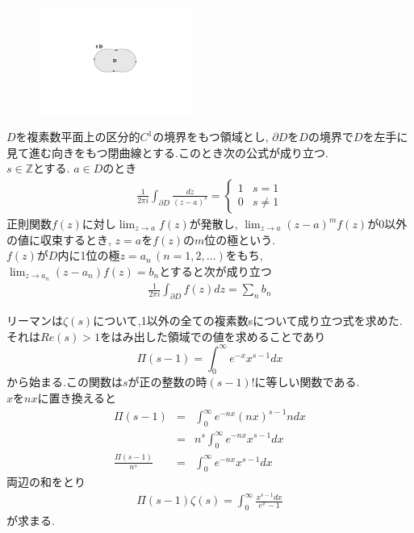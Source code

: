 \begin{figure}
\vspace{-2\baselineskip}
\begin{center}
\includegraphics[width=50mm]{zetamura1.pdf}
\end{center}
\end{figure}
$D$を複素数平面上の区分的$C^1$の境界をもつ領域とし, $\partial D$を$D$の境界で$D$を左手に見て進む向きをもつ閉曲線とする.このとき次の公式が成り立つ.\\
$s\in \mathbb{Z}$とする. $a\in D$のとき
\begin{eqnarray*}
\frac{1}{2\pi i}\int_{\partial D} \frac{dz}{(z-a)^s} = \begin{cases}
1 & s=1 \\ 
0 & s\neq1
\end{cases}
\end{eqnarray*}
正則関数$f(z)$に対し$\displaystyle{\lim_{z\to a}f(z)}$が発散し, $\displaystyle{\lim_{z\to a}(z-a)^m f(z)}$が0以外の値に収束するとき, $z=a$を$f(z)$の$m$位の極という.\\
$f(z)$が$D$内に1位の極$z=a_n\,(n=1,2,\ldots)$をもち, $\displaystyle{\lim_{z\to a_n}(z-a_n)f(z)}=b_n$とすると次が成り立つ
\begin{eqnarray*}
\frac{1}{2\pi i}\int_{\partial D} f(z)dz = \sum_n b_n
\end{eqnarray*}

リーマンは$\zeta(s)$について,1以外の全ての複素数sについて成り立つ式を求めた.\\
それは$Re(s)>1$をはみ出した領域での値を求めることであり
\[
\Pi(s-1)=\int_0^\infty e^{-x}x^{s-1}dx
\]
から始まる.この関数は$s$が正の整数の時$(s-1)!$に等しい関数である.\\
$x$を$nx$に置き換えると
\begin{eqnarray*}
\Pi(s-1) &=& \int_0^\infty e^{-nx}(nx)^{s-1}ndx\\
&=& n^s \int_0^\infty e^{-nx}x^{s-1}dx\\
\frac{\Pi(s-1)}{n^s} &=& \int_0^\infty e^{-nx}x^{s-1}dx
\end{eqnarray*}
両辺の和をとり
\begin{align}
\Pi(s-1)\zeta(s)=\int_0^\infty \frac{x^{s-1}dx}{e^x-1}\label{eq:1}
\end{align}
が求まる.\\

